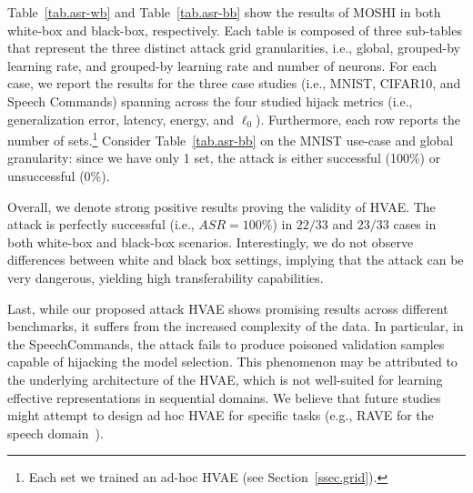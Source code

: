 Table~\ref{tab.asr-wb} and Table~\ref{tab.asr-bb} show the results of MOSHI in both white-box and black-box, respectively.
Each table is composed of three sub-tables that represent the three distinct attack grid granularities, i.e., global, grouped-by learning rate, and grouped-by learning rate and number of neurons.
For each case, we report the results for the three case studies (i.e., MNIST, CIFAR10, and Speech Commands) spanning across the four studied hijack metrics (i.e., generalization error, latency, energy, and $\ell_0$). 
Furthermore, each row reports the number of sets.\footnote{Each set we trained an ad-hoc HVAE (see Section~\ref{ssec.grid}).}
Consider Table~\ref{tab.asr-bb} on the MNIST use-case and global granularity: since we have only 1 set, the attack is either successful (100\%) or unsuccessful (0\%).
\par
Overall, we denote strong positive results proving the validity of HVAE. %
The attack is perfectly successful (i.e., $ASR = 100\%$) in $22/33$ and $23/33$ cases in both white-box and black-box scenarios.
Interestingly, we do not observe differences between white and black box settings, implying that the attack can be very dangerous, yielding high transferability capabilities. 
\par
Last, while our proposed attack HVAE shows promising results across different benchmarks, it suffers from the increased complexity of the data.
In particular, in the SpeechCommands, the attack fails to produce poisoned validation samples capable of hijacking the model selection.   
This phenomenon may be attributed to the underlying architecture of the HVAE, which is not well-suited for learning effective representations in sequential domains.
We believe that future studies might attempt to design ad hoc HVAE for specific tasks (e.g., RAVE for the speech domain~\cite{caillon2021rave}).
